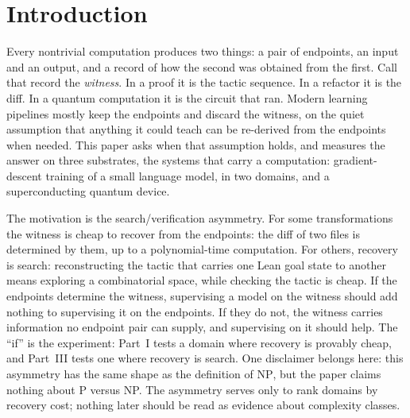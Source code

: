\section{Introduction}\label{sec:intro}

Every nontrivial computation produces two things: a pair of endpoints, an input and an output, and a record of how the second was obtained from the first. Call that record the \emph{witness}. In a proof it is the tactic sequence. In a refactor it is the diff. In a quantum computation it is the circuit that ran. Modern learning pipelines mostly keep the endpoints and discard the witness, on the quiet assumption that anything it could teach can be re-derived from the endpoints when needed. This paper asks when that assumption holds, and measures the answer on three substrates, the systems that carry a computation: gradient-descent training of a small language model, in two domains, and a superconducting quantum device.

The motivation is the search/verification asymmetry. For some transformations the witness is cheap to recover from the endpoints: the diff of two files is determined by them, up to a polynomial-time computation. For others, recovery is search: reconstructing the tactic that carries one Lean goal state to another means exploring a combinatorial space, while checking the tactic is cheap. If the endpoints determine the witness, supervising a model on the witness should add nothing to supervising it on the endpoints. If they do not, the witness carries information no endpoint pair can supply, and supervising on it should help. The ``if'' is the experiment: Part~I tests a domain where recovery is provably cheap, and Part~III tests one where recovery is search. One disclaimer belongs here: this asymmetry has the same shape as the definition of $\mathrm{NP}$, but the paper claims nothing about P versus NP. The asymmetry serves only to rank domains by recovery cost; nothing later should be read as evidence about complexity classes.

\begin{center}
\end{center}

